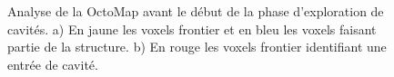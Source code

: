 \begin{figure}[ht]
  \centering
  \hfil
  \caption{
    Analyse de la OctoMap avant le début de la phase d'exploration de cavités.
    a) En jaune les voxels frontier et en bleu les voxels faisant partie de la structure.
    b) En rouge les voxels frontier identifiant une entrée de cavité.
  }
  \label{fig:ugv_frontier}
\end{figure}

